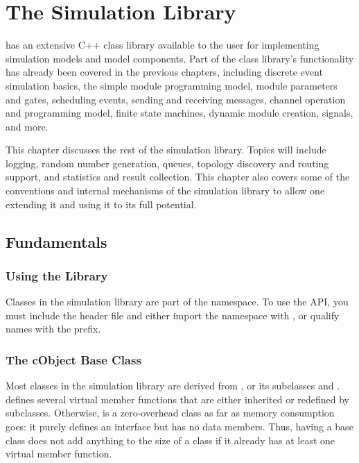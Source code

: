 \chapter{The Simulation Library}
\label{cha:the-simulation-library}

{\opp} has an extensive C++ class library available to the user for
implementing simulation models and model components. Part of the class
library's functionality has already been covered in the previous chapters,
including discrete event simulation basics, the simple module programming
model, module parameters and gates, scheduling events, sending and
receiving messages, channel operation and programming model, finite state
machines, dynamic module creation, signals, and more.

This chapter discusses the rest of the simulation library. Topics will
include logging, random number generation, queues, topology discovery and
routing support, and statistics and result collection. This chapter also
covers some of the conventions and internal mechanisms of the simulation
library to allow one extending it and using it to its full potential.


\section{Fundamentals}

\subsection{Using the Library}
\label{sec:ch-sim-lib:using-omnetpp}

Classes in the {\opp} simulation library are part of the 
namespace. To use the {\opp} API, you must include the 
header file and either import the namespace with , or qualify names with the  prefix.

\subsection{The cObject Base Class}
\label{sec:ch-sim-lib:cobject}

Most classes in the simulation library are derived from ,
or its subclasses  and .
 defines several virtual member functions that are either
inherited or redefined by subclasses. Otherwise,  is a
zero-overhead class as far as memory consumption goes: it purely defines an
interface but has no data members. Thus, having  a base
class does not add anything to the size of a class if it already has at
least one virtual member function.

